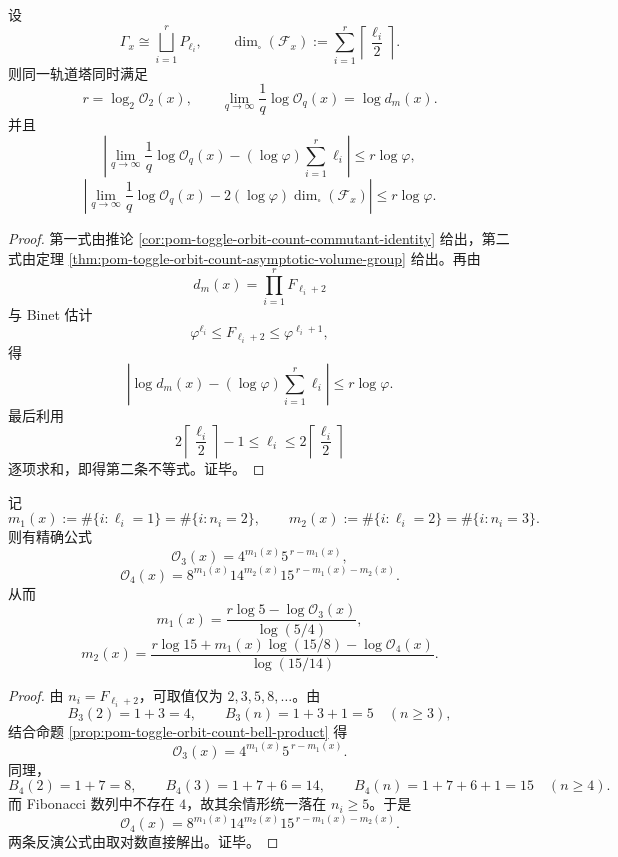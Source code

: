 \begin{corollary}\label{cor:pom-toggle-orbit-count-two-scale-tomography}
设
\[
\Gamma_x\cong \bigsqcup_{i=1}^r P_{\ell_i},
\qquad
\dim_\square(\mathcal F_x):=\sum_{i=1}^r \left\lceil\frac{\ell_i}{2}\right\rceil.
\]
则同一轨道塔同时满足
\[
r=\log_2\mathcal O_2(x),
\qquad
\lim_{q\to\infty}\frac1q\log \mathcal O_q(x)=\log d_m(x).
\]
并且
\[
\left|
\lim_{q\to\infty}\frac1q\log \mathcal O_q(x)
-(\log\varphi)\sum_{i=1}^r\ell_i
\right|
\le r\log\varphi,
\]
\[
\left|
\lim_{q\to\infty}\frac1q\log \mathcal O_q(x)
-2(\log\varphi)\dim_\square(\mathcal F_x)
\right|
\le r\log\varphi.
\]
\end{corollary}

\begin{proof}
第一式由推论 \ref{cor:pom-toggle-orbit-count-commutant-identity} 给出，第二式由定理 \ref{thm:pom-toggle-orbit-count-asymptotic-volume-group} 给出。再由
\[
d_m(x)=\prod_{i=1}^r F_{\ell_i+2}
\]
与 Binet 估计
\[
\varphi^{\ell_i}\le F_{\ell_i+2}\le \varphi^{\ell_i+1},
\]
得
\[
\left|\log d_m(x)-(\log\varphi)\sum_{i=1}^r\ell_i\right|\le r\log\varphi.
\]
最后利用
\[
2\left\lceil\frac{\ell_i}{2}\right\rceil-1\le \ell_i\le 2\left\lceil\frac{\ell_i}{2}\right\rceil
\]
逐项求和，即得第二条不等式。证毕。
\end{proof}

\begin{theorem}\label{thm:pom-toggle-orbit-count-finite-lowlevel-inversion}
记
\[
m_1(x):=\#\{i:\ell_i=1\}=\#\{i:n_i=2\},
\qquad
m_2(x):=\#\{i:\ell_i=2\}=\#\{i:n_i=3\}.
\]
则有精确公式
\[
\mathcal O_3(x)=4^{m_1(x)}5^{\,r-m_1(x)},
\]
\[
\mathcal O_4(x)=8^{m_1(x)}14^{m_2(x)}15^{\,r-m_1(x)-m_2(x)}.
\]
从而
\[
m_1(x)=\frac{r\log 5-\log \mathcal O_3(x)}{\log(5/4)},
\]
\[
m_2(x)=
\frac{r\log 15+m_1(x)\log(15/8)-\log \mathcal O_4(x)}{\log(15/14)}.
\]
\end{theorem}

\begin{proof}
由 \(n_i=F_{\ell_i+2}\)，可取值仅为 \(2,3,5,8,\dots\)。由
\[
B_3(2)=1+3=4,
\qquad
B_3(n)=1+3+1=5\quad(n\ge 3),
\]
结合命题 \ref{prop:pom-toggle-orbit-count-bell-product} 得
\[
\mathcal O_3(x)=4^{m_1(x)}5^{\,r-m_1(x)}.
\]
同理，
\[
B_4(2)=1+7=8,
\qquad
B_4(3)=1+7+6=14,
\qquad
B_4(n)=1+7+6+1=15\quad(n\ge 4).
\]
而 Fibonacci 数列中不存在 \(4\)，故其余情形统一落在 \(n_i\ge 5\)。于是
\[
\mathcal O_4(x)=8^{m_1(x)}14^{m_2(x)}15^{\,r-m_1(x)-m_2(x)}.
\]
两条反演公式由取对数直接解出。证毕。
\end{proof}

